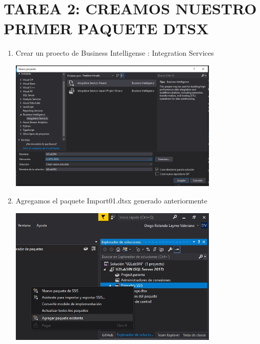 \section{TAREA 2: CREAMOS NUESTRO PRIMER PAQUETE DTSX}

\begin{enumerate}
    \item Crear un proecto de Business Intelligense : Integration Services
     \begin{center}
            \includegraphics[width=10cm]{imagenes/bi_1.jpg}
        \end{center}
        
    \item Agregamos el paquete Import01.dtsx generado anteriormente
     \begin{center}
            \includegraphics[width=10cm]{imagenes/bi_2.jpg}
        \end{center}
        
        
                

\end{enumerate}
